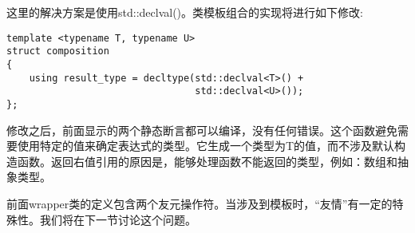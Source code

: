 这里的解决方案是使用std::declval()。类模板组合的实现将进行如下修改:

\begin{lstlisting}[style=styleCXX]
template <typename T, typename U>
struct composition
{
	using result_type = decltype(std::declval<T>() +
								 std::declval<U>());
};
\end{lstlisting}

修改之后，前面显示的两个静态断言都可以编译，没有任何错误。这个函数避免需要使用特定的值来确定表达式的类型。它生成一个类型为T的值，而不涉及默认构造函数。返回右值引用的原因是，能够处理函数不能返回的类型，例如：数组和抽象类型。

前面wrapper类的定义包含两个友元操作符。当涉及到模板时，“友情”有一定的特殊性。我们将在下一节讨论这个问题。

















